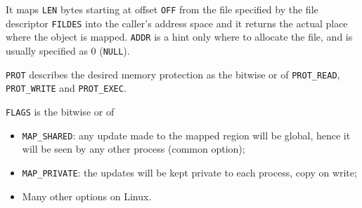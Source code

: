 It maps \texttt{LEN} bytes starting at offset \texttt{OFF} from the file specified by the file descriptor \texttt{FILDES} into the caller's address space and it returns the actual place where the object is mapped. \texttt{ADDR} is a hint only where to allocate the file, and is usually specified as 0 (\texttt{NULL}).

\texttt{PROT} describes the desired memory protection as the bitwise or of \texttt{PROT\_READ}, \texttt{PROT\_WRITE} and \texttt{PROT\_EXEC}.

\texttt{FLAGS} is the bitwise or of
\begin{itemize}
\item \texttt{MAP\_SHARED}: any update made to the mapped region will be global, hence it will be seen by any other process (common option);
\item \texttt{MAP\_PRIVATE}: the updates will be kept private to each process, copy on write;
\item Many other options on Linux.
\end{itemize}